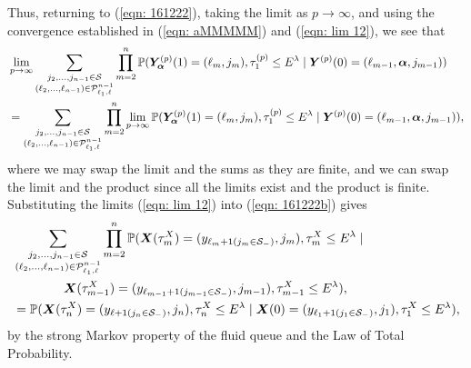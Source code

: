 Thus, returning to (\ref{eqn: 161222}), taking the limit as \(p\to\infty\), and using the convergence established in (\ref{eqn: aMMMMM}) and (\ref{eqn: lim 12}), we see that  
\begin{align}
	&\lim_{p\to\infty}\sum_{\substack{j_2,\dots,j_{n-1}\in\mathcal S \\ (\ell_2,\dots,\ell_{n-1}) \in\mathcal P^{n-1}_{\ell_1,\ell}}}\prod_{m=2}^{n}\mathbb P(\bm{Y}_{\bm{\alpha}}^{(p)}(1) = (\ell_m, j_m), \tau_{1}^{(p)}\leq E^\lambda \nonumber
            	 \mid \boldsymbol Y^{(p)}(0) = (\ell_{m-1},\boldsymbol\alpha, j_{m-1})) \nonumber 
	\\ &=\sum_{\substack{j_2,\dots,j_{n-1}\in\mathcal S \\ (\ell_2,\dots,\ell_{n-1}) \in\mathcal P^{n-1}_{\ell_1,\ell}}}\prod_{m=2}^{n}\lim_{p\to\infty} \mathbb P(\bm{Y}_{\bm{\alpha}}^{(p)}(1) = (\ell_m, j_m), \tau_{1}^{(p)}\leq E^\lambda 
            	 \mid \boldsymbol Y^{(p)}(0) = (\ell_{m-1}, \boldsymbol\alpha,
	 	 j_{m-1}) ),
	 \label{eqn: 161222b}
\end{align}
where we may swap the limit and the sums as they are finite, and we can swap the limit and the product since all the limits exist and the product is finite. Substituting the limits (\ref{eqn: lim 12}) into (\ref{eqn: 161222b}) gives 
\begin{align}
	&\sum_{\substack{j_2,\dots,j_{n-1}\in\mathcal S \\ (\ell_2,\dots,\ell_{n-1}) \in\mathcal P^{n-1}_{\ell_1,\ell}}} \prod_{m=2}^{n}\mathbb P(\boldsymbol X(\tau_m^X) = (y_{\ell_{m}+1(j_{m}\in\mathcal S_-)}, j_m), \tau_{m}^X\leq E^\lambda\mid \nonumber
            	\\&\qquad\qquad  \boldsymbol X(\tau_{m-1}^X)=(y_{\ell_{m-1}+1(j_{m-1}\in\mathcal S_-)},j_{m-1}),\tau_{m-1}^X\leq E^\lambda),\nonumber
		\\&= \mathbb P(\boldsymbol X(\tau_n^X) = (y_{\ell+1(j_{n}\in\mathcal S_-)}, 
		j_n), \tau_{n}^X\leq E^\lambda \mid \boldsymbol X(0)=(y_{\ell_{1}+1(j_{1}\in\mathcal S_-)},
		j_{1}), 
		\tau_1^X\leq E^\lambda),
\end{align}
by the strong Markov property of the fluid queue and the Law of Total Probability.

